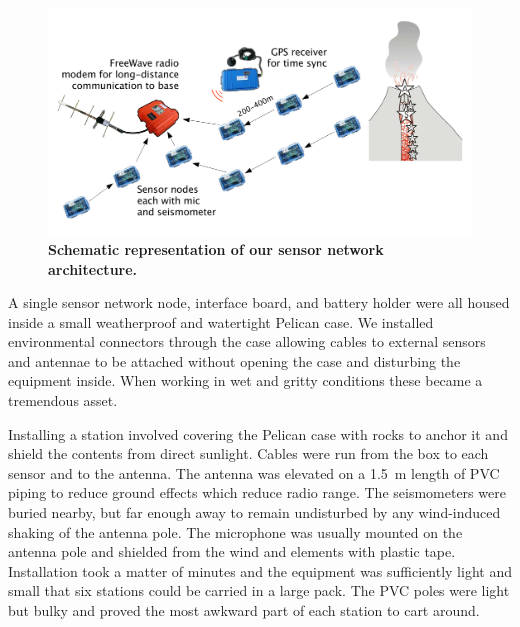 \begin{figure}[t]
\begin{center}
\includegraphics[width=0.7\hsize]{./figures/schematic}
\end{center}
\caption{\small {\bf {Schematic representation of our sensor network
architecture.}}}
\label{fig-picture}
\end{figure}

A single sensor network node, interface board, and battery holder were all
housed inside a small weatherproof and watertight Pelican case.  We installed
environmental connectors through the case allowing cables to external sensors
and antennae to be attached without opening the case and disturbing the
equipment inside.  When working in wet and gritty conditions these became a
tremendous asset.


Installing a station involved covering the Pelican case with rocks to anchor
it and shield the contents from direct sunlight.  Cables were run from the
box to each sensor and to the antenna.  The antenna was elevated on a 1.5~m
length of PVC piping to reduce ground effects which reduce radio range.  The
seismometers were buried nearby, but far enough away to remain undisturbed by
any wind-induced shaking of the antenna pole.  The microphone was usually
mounted on the antenna pole and shielded from the wind and elements with
plastic tape.  Installation took a matter of minutes and the equipment was
sufficiently light and small that six stations could be carried in a large
pack.  The PVC poles were light but bulky and proved the most awkward part of
each station to cart around.


